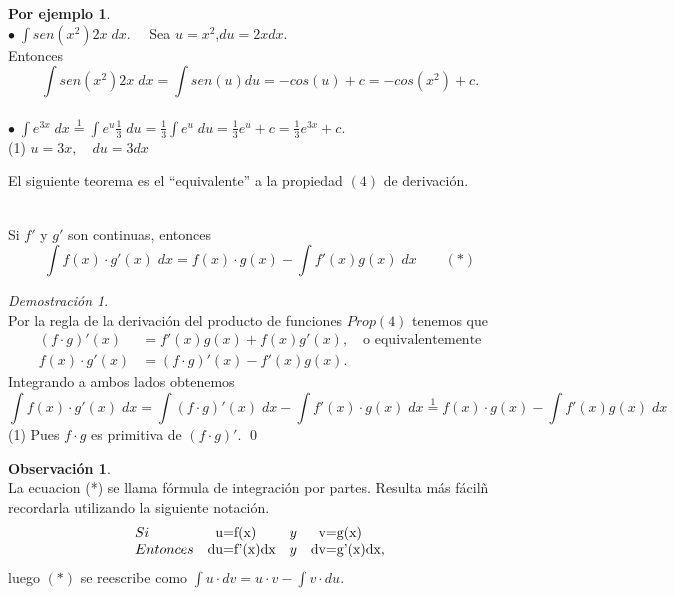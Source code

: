 \documentclass{article}
\theoremstyle{definition}
\theoremstyle{definition}
\newtheorem*{obs}{Observación}
\newtheorem*{ej}{Por ejemplo}
\theoremstyle{remark}
\newtheorem*{demo}{Demostración}
\newcommand\bl{$\bullet\;$}
\begin{document}
\begin{ej} \; \\

\bl $\int{sen(x^2)2x\;dx}.\quad$ Sea $u=x^2$,\quad $du=2xdx$.
\\Entonces\[
\int{sen(x^2)2x\;dx}=\int{sen(u)du}=-cos(u)+c=-cos(x^2)+c. \]
\\
\bl ${\int{e^{3x}\;dx}}\overset{1}{=}\int{e^u}\frac{1}{3}\;du=\frac{1}{3}\int{e^u\;du}=\frac{1}{3}e^u+c=\frac{1}{3}e^{3x}+c$.\\
(1) $u=3x,\quad du=3dx$
\end{ej}
El siguiente teorema es el ``equivalente'' a la propiedad $(4)$ de derivación. 
\pagebreak
\begin{teo}\; \\
Si $f'$ y $g'$ son continuas, entonces \[
\int{f(x)\cdot g'(x)\; dx}=f(x)\cdot g(x) - \int{f'(x)g(x)\;dx}\quad \quad (*) \]
\end{teo}
\begin{demo} \; \\
  Por la regla de la derivación del producto de funciones $Prop (4)$ tenemos que
\begin{align*}
    (f\cdot g)'(x)  &= f'(x)g(x)+f(x)g'(x),\quad \text{o equivalentemente}\\
    f(x)\cdot g'(x) &= (f\cdot g)'(x)-f'(x)g(x).
\end{align*}
Integrando a ambos lados obtenemos
\[
\int{f(x) \cdot g'(x)\; dx}=\int{(f\cdot g)'(x)\;dx}-\int{f'(x)\cdot g(x)\; dx}\overset{1}{=}f(x)\cdot g(x)-\int{f'(x) g(x)\; dx}\]
(1) Pues $f\cdot g$ es primitiva de $(f\cdot g)'$.  \qed
\end{demo}
\begin{obs} \; \\
  La ecuacion (*) se llama fórmula de integración por partes. Resulta más fácilñ recordarla utilizando la siguiente notación.
\[
  \begin{array}[t]{llcl}
  Si       & $\;\;u=f(x)$     & y & $\;\;v=g(x)$ \\
  Entonces & $du=f'(x)dx$ & y & $dv=g'(x)dx$,
    \end{array}
\]
luego $(*)$ se reescribe como $\int{u\cdot dv}=u\cdot v-\int{v\cdot du}$.
\end{obs}
\end{document}
